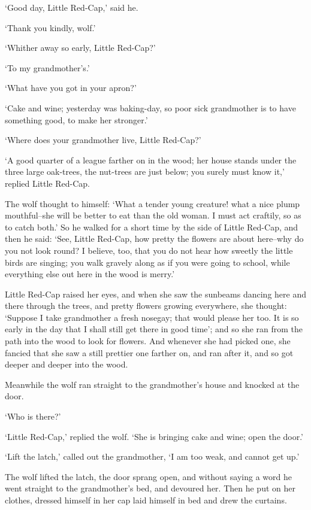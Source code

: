 \documentclass[oneside,11pt]{memoir} %
\begin{document}
`Good day, Little Red-Cap,' said he.

`Thank you kindly, wolf.'

`Whither away so early, Little Red-Cap?'

`To my grandmother's.'

`What have you got in your apron?'

`Cake and wine; yesterday was baking-day, so poor sick grandmother is to have something good, to make her stronger.'

`Where does your grandmother live, Little Red-Cap?'

`A good quarter of a league farther on in the wood; her house stands under the three large oak-trees, the nut-trees are just below; you surely must know it,' replied Little Red-Cap.

The wolf thought to himself: `What a tender young creature! what a nice plump mouthful--she will be better to eat than the old woman. I must act craftily, so as to catch both.' So he walked for a short time by the side of Little Red-Cap, and then he said: `See, Little Red-Cap, how pretty the flowers are about here--why do you not look round? I believe, too, that you do not hear how sweetly the little birds are singing; you walk gravely along as if you were going to school, while everything else out here in the wood is merry.'

Little Red-Cap raised her eyes, and when she saw the sunbeams dancing here and there through the trees, and pretty flowers growing everywhere, she thought: `Suppose I take grandmother a fresh nosegay; that would please her too. It is so early in the day that I shall still get there in good time'; and so she ran from the path into the wood to look for flowers. And whenever she had picked one, she fancied that she saw a still prettier one farther on, and ran after it, and so got deeper and deeper into the wood.

Meanwhile the wolf ran straight to the grandmother's house and knocked at the door.

`Who is there?'

`Little Red-Cap,' replied the wolf. `She is bringing cake and wine; open the door.'

`Lift the latch,' called out the grandmother, `I am too weak, and cannot get up.'

The wolf lifted the latch, the door sprang open, and without saying a word he went straight to the grandmother's bed, and devoured her. Then he put on her clothes, dressed himself in her cap laid himself in bed and drew the curtains.
\end{document}
